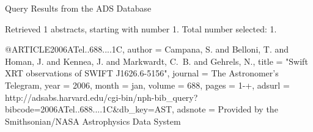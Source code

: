 Query Results from the ADS Database


Retrieved 1 abstracts, starting with number 1.  Total number selected: 1.

@ARTICLE{2006ATel..688....1C,
   author = {{Campana}, S. and {Belloni}, T. and {Homan}, J. and {Kennea}, J. and 
	{Markwardt}, C.~B. and {Gehrels}, N.},
    title = "{Swift XRT observations of SWIFT J1626.6-5156}",
  journal = {The Astronomer's Telegram},
     year = 2006,
    month = jan,
   volume = 688,
    pages = {1-+},
   adsurl = {http://adsabs.harvard.edu/cgi-bin/nph-bib_query?bibcode=2006ATel..688....1C&db_key=AST},
  adsnote = {Provided by the Smithsonian/NASA Astrophysics Data System}
}


